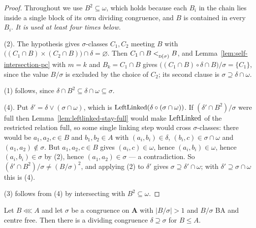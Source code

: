 \begin{proof}
Throughout we use $B^{2}\subseteq\omega$, which holds because each $B_{i}$ in
the chain lies inside a single block of its own dividing congruence, and $B$ is
contained in every $B_{i}$. \emph{It is used at least four times below.}

(2). The hypothesis gives $\sigma$-classes $C_{1},C_{2}$ meeting $B$ with
$\bigl((C_{1}\cap B)\times(C_{2}\cap B)\bigr)\cap\delta=\varnothing$. Then
$C_{1}\cap B<_{\textup{\textsc{d}}(\sigma)}^{}B$, and Lemma~\ref{lem:self-intersection-pc} with
$m=k$ and $B_{k}=C_{1}\cap B$ gives
$\bigl((C_{1}\cap B)\circ\delta\cap B\bigr)/\sigma=\{C_{1}\}$, since the value
$B/\sigma$ is excluded by the choice of $C_{2}$; its second clause is
$\sigma\supseteq\delta\cap\omega$.

(1) follows, since $\delta\cap B^{2}\subseteq\delta\cap\omega\subseteq\sigma$.

(4). Put $\delta'=\delta\vee(\sigma\cap\omega)$, which is
$\operatorname{LeftLinked}(\delta\circ(\sigma\cap\omega))$. If
$(\delta'\cap B^{2})/\sigma$ were full then Lemma~\ref{lem:leftlinked-stay-full}
would make $\operatorname{LeftLinked}$ of the restricted relation full, so some
single linking step would cross $\sigma$-classes: there would be
$a_{1},a_{2},c\in B$ and $b_{1},b_{2}\in A$ with $(a_{i},b_{i})\in\delta$,
$(b_{i},c)\in\sigma\cap\omega$ and $(a_{1},a_{2})\notin\sigma$. But
$a_{1},a_{2},c\in B$ gives $(a_{i},c)\in\omega$, hence $(a_{i},b_{i})\in\omega$,
hence $(a_{i},b_{i})\in\sigma$ by (2), hence $(a_{1},a_{2})\in\sigma$ --- a
contradiction. So $(\delta'\cap B^{2})/\sigma\neq(B/\sigma)^{2}$, and applying
(2) to $\delta'$ gives $\sigma\supseteq\delta'\cap\omega$; with
$\delta'\supseteq\sigma\cap\omega$ this is (4).

(3) follows from (4) by intersecting with $B^{2}\subseteq\omega$.
\end{proof}

\begin{lemma}\label{lem:main-existence}
Let $B\lll A$ and let $\sigma$ be a congruence on $\mathbf A$ with
$|B/\sigma|>1$ and $B/\sigma$ BA and centre free. Then there is a dividing
congruence $\delta\supseteq\sigma$ for $B\le A$.
\end{lemma}

